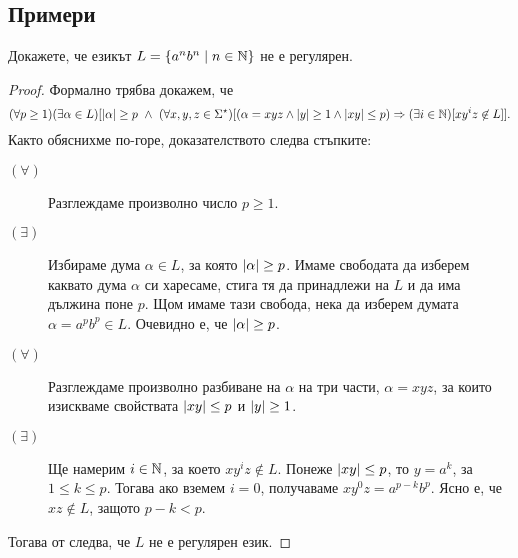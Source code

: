 \subsection{Примери}

\begin{problem}\label{prob:regular:pumping:an-bn}
  Докажете, че езикът $L = \{a^nb^n \mid n\in \mathbb{N}\}$ не е регулярен.
\end{problem}
\begin{proof}
  Формално трябва докажем, че
  {\scriptsize
    \[(\forall p \geq 1)(\exists \alpha \in L)[\vert{\alpha}\vert \geq p\ \wedge\ (\forall x,y,z\in\Sigma^\star)[(\alpha = xyz \wedge \vert{y}\vert \geq 1\wedge \vert{xy}\vert \leq p) \Rightarrow (\exists i\in\mathbb{N})[xy^iz \not\in L]].\]}
  Както обяснихме по-горе, доказателството следва стъпките:
  \begin{description}
  \item[$(\forall)$]
    Разглеждаме произволно число $p \geq 1$.
  \item[$(\exists)$]
    Избираме дума $\alpha \in L$, за която $\vert{\alpha}\vert \geq p$. Имаме свободата да изберем каквато дума $\alpha$
    си харесаме, стига тя да принадлежи на $L$ и да има дължина поне $p$.
    Щом имаме тази свобода, нека да изберем думата $\alpha = a^pb^p \in L$.
    Очевидно е, че $\vert{\alpha}\vert \geq p$.
  \item[$(\forall)$]
    Разглеждаме произволно разбиване на $\alpha$ на три части, $\alpha = xyz$,
    за които изискваме свойствата $\vert{xy}\vert \leq p$ и $\vert{y}\vert \geq 1$.
  \item[$(\exists)$]
    Ще намерим $i\in\mathbb{N}$, за което $xy^iz \not\in L$.
    Понеже $\vert{xy}\vert \leq p$, то $y = a^k$, за  $1\leq k \leq p$.
    Тогава ако вземем $i = 0$, получаваме $xy^0z = a^{p-k}b^p$.
    Ясно е, че $xz \not\in L$, защото $p-k < p$.
  \end{description}  
  Тогава от  следва, че $L$ не е регулярен език.
\end{proof}

